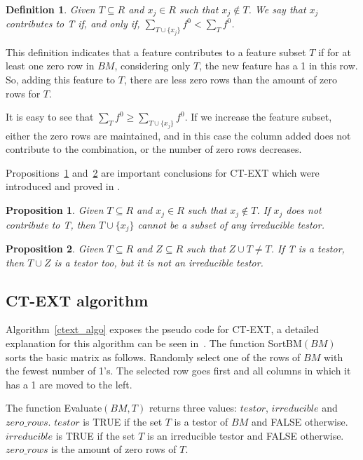 \documentclass[authoryear,preprint,review,12pt]{elsarticle}
\newtheorem{definition}{Definition}
\newtheorem{proposition}{Proposition}
\begin{document}
\begin{definition} \label{def25} Given $T \subseteq R$ and $x_j \in R$ such that $x_j \notin T$. 
We say that $x_j$ contributes to T if, and only if, $\sum_{T\cup\{x_j\}} f^0 < \sum_T f^0$.
\end{definition}
This definition indicates that a feature contributes to a feature subset $T$
if for at least one zero row in $BM$, considering only $T$, the new feature has a 1 in 
this row. So, adding this feature to $T$, there are less
zero rows than the amount of zero rows for $T$.

It is easy to see that $\sum_T f^0 \geq \sum_{T\cup\{x_j\}} f^0$. If we
increase the feature subset, either the zero rows are maintained, and in this
case the column added does not contribute to the combination, or the number of zero rows decreases.

Propositions~\ref{prop1} and~\ref{prop2} are important conclusions for CT-EXT which were introduced and 
proved in \citep{R22}.

\begin{proposition}\label{prop1} Given $T \subseteq R$ and  $x_j \in R$ such that $x_j \notin T$. If $x_j$ does not contribute to T, then $T\cup\{x_j\}$ cannot be a subset of any irreducible testor.
\end{proposition}

\begin{proposition}\label{prop2} Given $T \subseteq R$ and $Z \subseteq R$ such that $Z \cup T \neq T$. If T is a testor, 
then $T \cup Z$ is a testor too, but it is not an irreducible testor.
\end{proposition}

\subsection{CT-EXT algorithm}
Algorithm~\ref{ctext_algo} exposes the pseudo code for CT-EXT, a detailed explanation for 
this algorithm can be seen in~\citep{R22}. The function SortBM$(BM)$ sorts the basic matrix as follows.
Randomly select one of the rows of $BM$ with the fewest number of 1's. The selected row goes first and 
all columns in which it has a 1 are moved to the left.  

The function Evaluate$(BM,T)$ returns three values: $testor$, $irreducible$ and $zero\_rows$. $testor$ is TRUE if the set $T$ is a testor of $BM$ and FALSE otherwise. $irreducible$ is TRUE if the set $T$ is an irreducible testor and FALSE otherwise. $zero\_rows$ is the amount of zero rows of $T$. 
\end{document}
